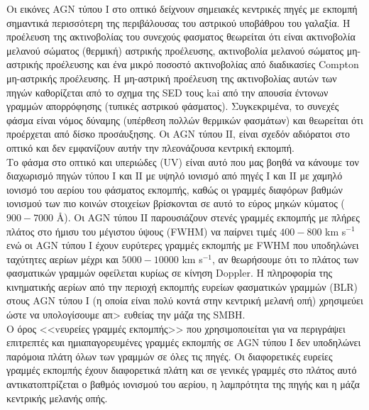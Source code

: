 Οι εικόνες \textlatin{AGN} τύπου Ι στο οπτικό δείχνουν σημειακές κεντρικές πηγές με εκπομπή σημαντικά περισσότερη της περιβάλουσας του αστρικού υποβάθρου του γαλαξία. Η προέλευση της ακτινοβολίας του συνεχούς φασματος θεωρείται ότι είναι ακτινοβολία μελανού σώματος (θερμική) αστρικής προέλευσης,  ακτινοβολία μελανού σώματος μη-αστρικής προέλευσης και ένα μικρό ποσοστό ακτινοβολίας από διαδικασίες \textlatin{Compton} μη-αστρικής προέλευσης. Η μη-αστρική προέλευση της ακτινοβολίας αυτών των πηγών καθορίζεται από το σχημα της \textlatin{SED} τους kai από την απουσία έντονων γραμμών απορρόφησης (τυπικές αστρικού φάσματος). Συγκεκριμένα, το συνεχές φάσμα είναι νόμος δύναμης (υπέρθεση πολλών θερμικών φασμάτων) και θεωρείται ότι προέρχεται από δίσκο προσάυξησης. Οι \textlatin{AGN} τύπου ΙΙ, είναι σχεδόν αδιόρατοι στο οπτικό και δεν εμφανίζουν αυτήν την πλεονάζουσα κεντρική εκπομπή.\\ 
Το φάσμα στο οπτικό και υπεριώδες \textlatin{(UV)} είναι αυτό που μας βοηθά να κάνουμε τον διαχωρισμό πηγών τύπου Ι και ΙΙ με υψηλό ιονισμό από πηγές Ι και ΙΙ με χαμηλό ιονισμό του αερίου του φάσματος εκπομπής, καθώς οι γραμμές διαφόρων βαθμών ιονισμού των πιο κοινών στοιχείων βρίσκονται σε αυτό το εύρος μηκών κύματος ($900-7000$ \AA). 
Οι \textlatin{AGN} τύπου ΙΙ παρουσιάζουν στενές γραμμές εκπομπής με πλήρες πλάτος στο ήμισυ του μέγιστου ύψους (\textlatin{FWHM}) να παίρνει τιμές $400-800$ \textlatin{km  s}$^{-1}$
ενώ οι \textlatin{AGN} τύπου Ι έχουν ευρύτερες γραμμές εκπομπής με \textlatin{FWHM} που υποδηλώνει ταχύτητες αερίων μέχρι και $5000 - 10000$ \textlatin{km  s}$^{-1}$, αν θεωρήσουμε ότι το πλάτος των φασματικών γραμμών οφείλεται κυρίως σε κίνηση \textlatin{Doppler.} Η πληροφορία της κινηματικής αερίων από την περιοχή εκπομπής ευρείων φασματικών γραμμών \textlatin{(BLR)} στους \textlatin{AGN} τύπου Ι (η οποία είναι πολύ κοντά στην κεντρική μελανή οπή) χρησιμεύει ώστε να υπολογίσουμε απ> ευθείας την μάζα της \textlatin{SMBH}\cite{netzer_2013}.\\
Ο όρος <<vευρείες γραμμές εκπομπής>> που χρησιμοποιείται για να περιγράψει επιτρεπτές και ημιαπαγορευμένες γραμμές εκπομπής σε \textlatin{AGN} τύπου Ι δεν υποδηλώνει παρόμοια πλάτη όλων των γραμμών σε όλες τις πηγές. Οι διαφορετικές ευρείες γραμμές εκπομπής έχουν διαφορετικά πλάτη και σε γενικές γραμμές στο πλάτος αυτό αντικατοπτρίζεται ο βαθμός ιονισμού του αερίου, η λαμπρότητα της πηγής και η μάζα κεντρικής μελανής οπής.


